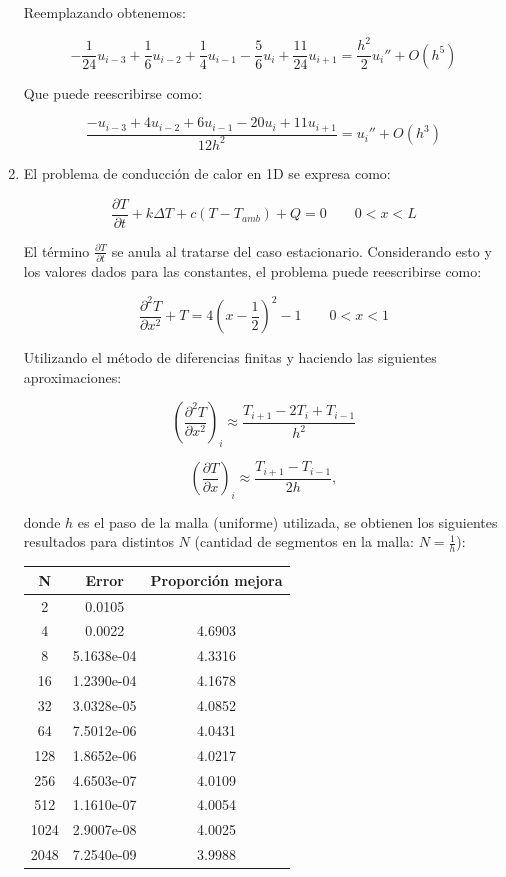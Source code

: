 \documentclass{article}
\begin{document}
\begin{enumerate}[1)]
{        Reemplazando obtenemos:

        \[ -\frac{1}{24} u_{i-3} + \frac{1}{6} u_{i-2} + \frac{1}{4} u_{i-1} - \frac{5}{6} u_i + \frac{11}{24} u_{i+1} = 
        \frac{h^2}{2}u_i'' + O(h^5) \]

        Que puede reescribirse como:

        \[ \frac{-u_{i-3} + 4 u_{i-2} + 6 u_{i-1} -20 u_i + 11 u_{i+1}}{12 h^2} = u_i'' + O(h^3) \]
    }
    \item{ %
        El problema de conducción de calor en 1D se expresa como:

        \[ \frac{\partial T}{\partial t} + k \Delta T + c (T - T_{amb}) + Q = 0 \qquad 0 < x < L \]

        El término $\frac{\partial T}{\partial t}$ se anula al tratarse del caso estacionario. Considerando
        esto y los valores dados para las constantes, el problema puede reescribirse como:

        \[ \frac{\partial^2 T}{\partial x^2} + T = 4 \left(x - \frac{1}{2} \right)^2 - 1 \qquad 0 < x < 1 \]

        Utilizando el método de diferencias finitas y haciendo las siguientes aproximaciones:

        \[ \left( \frac{\partial^2 T}{\partial x^2} \right)_i 
           \approx
           \frac{T_{i+1} - 2 T_i + T_{i-1}}{h^2} \]

        \[ \left( \frac{\partial T}{\partial x} \right)_i 
           \approx
           \frac{T_{i+1} - T_{i-1}}{2 h}, \]

        donde $h$ es el paso de la malla (uniforme) utilizada, se obtienen los siguientes resultados
        para distintos $N$ (cantidad de segmentos en la malla: $N = \frac{1}{h}$):

        \begin{tabular}{|c|c|c|}
            \hline
            \textbf{N} & \textbf{Error} & \textbf{Proporción mejora} \\
            \hline
             2 & 0.0105 & \\
            \hline
             4 & 0.0022 & 4.6903 \\
            \hline
             8 & 5.1638e-04 & 4.3316 \\
            \hline
            16 & 1.2390e-04 & 4.1678 \\
            \hline
            32 & 3.0328e-05 & 4.0852 \\
            \hline
            64 & 7.5012e-06 & 4.0431 \\
            \hline
            128 & 1.8652e-06 & 4.0217 \\
            \hline
            256 & 4.6503e-07 & 4.0109 \\
            \hline
            512 & 1.1610e-07 & 4.0054 \\
            \hline
            1024 & 2.9007e-08 & 4.0025 \\
            \hline
            2048 & 7.2540e-09 & 3.9988 \\
            \hline
        \end{tabular}

}
\end{enumerate}
\end{document}
